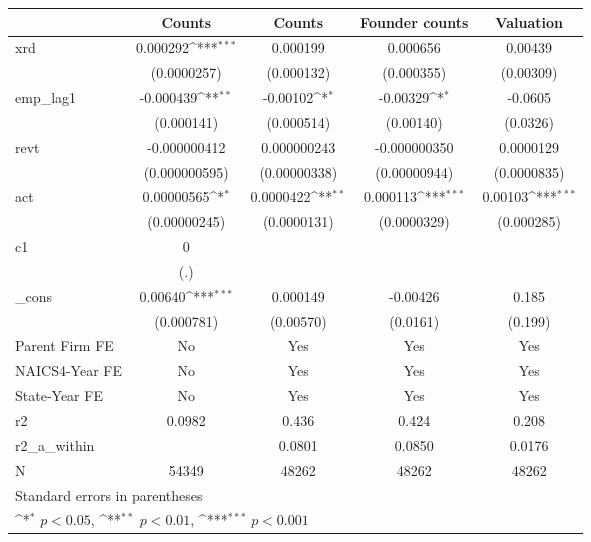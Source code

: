 {
\def\sym#1{\ifmmode^{#1}\else\(^{#1}\)\fi}
\begin{tabular}{l*{4}{c}}
\hline\hline
            &\multicolumn{1}{c}{Counts}&\multicolumn{1}{c}{Counts}&\multicolumn{1}{c}{Founder counts}&\multicolumn{1}{c}{Valuation}\\
\hline
xrd         &    0.000292\sym{***}&    0.000199         &    0.000656         &     0.00439         \\
            & (0.0000257)         &  (0.000132)         &  (0.000355)         &   (0.00309)         \\
[1em]
emp\_lag1    &   -0.000439\sym{**} &    -0.00102\sym{*}  &    -0.00329\sym{*}  &     -0.0605         \\
            &  (0.000141)         &  (0.000514)         &   (0.00140)         &    (0.0326)         \\
[1em]
revt        &-0.000000412         & 0.000000243         &-0.000000350         &   0.0000129         \\
            &(0.000000595)         &(0.00000338)         &(0.00000944)         & (0.0000835)         \\
[1em]
act         &  0.00000565\sym{*}  &   0.0000422\sym{**} &    0.000113\sym{***}&     0.00103\sym{***}\\
            &(0.00000245)         & (0.0000131)         & (0.0000329)         &  (0.000285)         \\
[1em]
c1          &           0         &                     &                     &                     \\
            &         (.)         &                     &                     &                     \\
[1em]
\_cons      &     0.00640\sym{***}&    0.000149         &    -0.00426         &       0.185         \\
            &  (0.000781)         &   (0.00570)         &    (0.0161)         &     (0.199)         \\
[1em]
Parent Firm FE&          No         &         Yes         &         Yes         &         Yes         \\
[1em]
NAICS4-Year FE&          No         &         Yes         &         Yes         &         Yes         \\
[1em]
State-Year FE&          No         &         Yes         &         Yes         &         Yes         \\
\hline
r2          &      0.0982         &       0.436         &       0.424         &       0.208         \\
r2\_a\_within &                     &      0.0801         &      0.0850         &      0.0176         \\
N           &       54349         &       48262         &       48262         &       48262         \\
\hline\hline
\multicolumn{5}{l}{\footnotesize Standard errors in parentheses}\\
\multicolumn{5}{l}{\footnotesize \sym{*} \(p<0.05\), \sym{**} \(p<0.01\), \sym{***} \(p<0.001\)}\\
\end{tabular}
}
